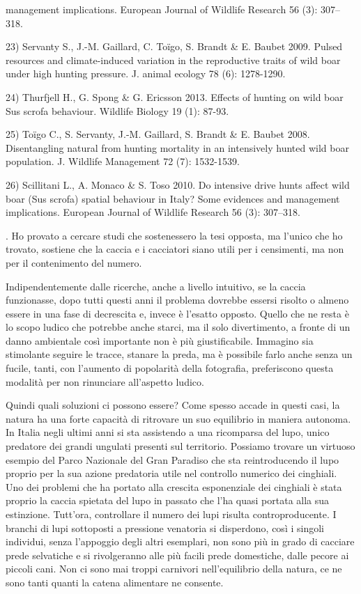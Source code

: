 \documentclass[12pt]{book} %
\begin{document}
\begin{mdframed}[linewidth=1pt]
{management implications. European Journal of Wildlife Research 56 (3): 307–318.\par 23) Servanty S., J.-M. Gaillard, C.
Toïgo, S. Brandt \& E. Baubet 2009. Pulsed resources and climate-induced variation in the reproductive traits of wild
boar under high hunting pressure. J. animal ecology 78 (6): 1278-1290.\par 24) Thurfjell H., G. Spong \& G. Ericsson
2013. Effects of hunting on wild boar Sus scrofa behaviour. Wildlife Biology 19 (1): 87-93.\par 25) Toïgo C., S.
Servanty, J.-M. Gaillard, S. Brandt \& E. Baubet 2008. Disentangling natural from hunting mortality in an intensively
hunted wild boar population. J. Wildlife Management 72 (7): 1532-1539.\par 26) Scillitani L., A. Monaco \& S. Toso
2010. Do intensive drive hunts affect wild boar (Sus scrofa) spatial behaviour in Italy? Some evidences and management
implications. European Journal of Wildlife Research 56 (3): 307–318. }. Ho provato a cercare studi che sostenessero la
tesi opposta, ma l'unico che ho trovato, sostiene che la caccia e i cacciatori siano utili per i
censimenti, ma non per il contenimento del numero. 

Indipendentemente dalle ricerche, anche a livello intuitivo, se la caccia funzionasse, dopo tutti questi anni il
problema dovrebbe essersi risolto o almeno essere in una fase di decrescita e, invece è l'esatto
opposto. Quello che ne resta è lo scopo ludico che potrebbe anche starci, ma il solo divertimento, a fronte di un danno
ambientale così importante non è più giustificabile. Immagino sia stimolante seguire le tracce, stanare la preda, ma è
possibile farlo anche senza un fucile, tanti, con l'aumento di popolarità della fotografia,
preferiscono questa modalità per non rinunciare all'aspetto ludico.

Quindi quali soluzioni ci possono essere? Come spesso accade in questi casi, la natura ha una forte capacità di
ritrovare un suo equilibrio in maniera autonoma. In Italia negli ultimi anni si sta assistendo a una ricomparsa del
lupo, unico predatore dei grandi ungulati presenti sul territorio. Possiamo trovare un virtuoso esempio del Parco
Nazionale del Gran Paradiso che sta reintroducendo il lupo proprio per la sua azione predatoria utile nel controllo
numerico dei cinghiali. Uno dei problemi che ha portato alla crescita esponenziale dei cinghiali è stata proprio la
caccia spietata del lupo in passato che l'ha quasi portata alla sua estinzione.
Tutt'ora, controllare il numero dei lupi risulta controproducente. I branchi di lupi sottoposti a
pressione venatoria si disperdono, così i singoli individui, senza l'appoggio degli altri
esemplari, non sono più in grado di cacciare prede selvatiche e si rivolgeranno alle più facili prede domestiche, dalle
pecore ai piccoli cani. Non ci sono mai troppi carnivori nell'equilibrio della natura, ce ne sono
tanti quanti la catena alimentare ne consente.


\end{mdframed}
\end{document}
